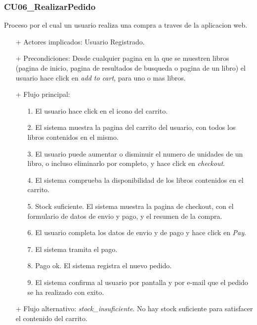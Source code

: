 \documentclass[a4paper]{report}
\begin{document}
            \subsubsection{CU06\_RealizarPedido}
                Proceso por el cual un usuario realiza una compra a traves de la aplicacion web.
                \begin{itemize}
                    \item[+] Actores implicados: Usuario Registrado.
                    \item[+] Precondiciones: Desde cualquier pagina en la que se muestren libros (pagina de inicio, pagina de resultados de busqueda o pagina de un libro) el usuario hace click en \emph{add to cart}, para uno o mas libros.
                    \item[+] Flujo principal:
                    \begin{enumerate}
                        \item[1.] El usuario hace click en el icono del carrito.
                        \item[2.] El sistema muestra la pagina del carrito del usuario, con todos los libros contenidos en el mismo.
                        \item[3.] El usuario puede aumentar o disminuir el numero de unidades de un libro, o incluso eliminarlo por completo, y hace click en \emph{checkout}.
                        \item[4.] El sistema comprueba la disponibilidad de los libros contenidos en el carrito.
                        \item[5.] Stock suficiente. El sistema muestra la pagina de checkout, con el formulario de datos de envio y pago, y el resumen de la compra.
                        \item[6.] El usuario completa los datos de envio y de pago y hace click en \emph{Pay}.
                        \item[7.] El sistema tramita el pago.
                        \item[8.] Pago ok. El sistema registra el nuevo pedido.
                        \item[9.] El sistema confirma al usuario por pantalla y por e-mail que el pedido se ha realizado con exito.
                    \end{enumerate}
                    \item[+] Flujo alternativo: \emph{stock\_insuficiente}. No hay stock suficiente para satisfacer el contenido del carrito.

\end{itemize}
\end{document}
